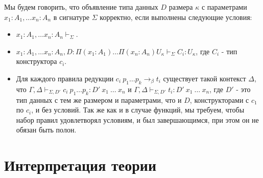 \documentclass{amsart}
\theoremstyle{definition}
\theoremstyle{remark}
\numberwithin{figure}{section}
\begin{document}
Мы будем говорить, что объявление типа данных $D$ размера $\kappa$ с параметрами $x_1 : A_1, \ldots x_n : A_n$ в сигнатуре $\Sigma$ корректно, если выполнены следующие условия:
\begin{itemize}
\item $x_1 : A_1, \ldots x_n : A_n \vdash_\Sigma$.
\item $x_1 : A_1, \ldots x_n : A_n, D : \Pi (x_1 : A_1) \ldots \Pi (x_n : A_n) U_\kappa \vdash_\Sigma C_i : U_\kappa$, где $C_i$ - тип конструктора $c_i$.
\item Для каждого правила редукции $c_i\ p_1 \ldots p_k \to_\beta t_i$ существует такой контекст $\Delta$,
    что $\Gamma, \Delta \vdash_{\Sigma,D'} c_i\ p_1 \ldots p_k : D'\ x_1\ \ldots\ x_n$ и $\Gamma, \Delta \vdash_{\Sigma,D'} t_i : D'\ x_1\ \ldots\ x_n$,
    где $D'$ - это тип данных с тем же размером и параметрами, что и $D$, конструкторами с $c_1$ по $c_i$, и без условий.
    Так же как и в случае функций, мы требуем, чтобы набор правил удовлетворял условиям, и был завершающимся, при этом он не обязан быть полон.
\end{itemize}

\section{Интерпретация теории}
\end{document}

